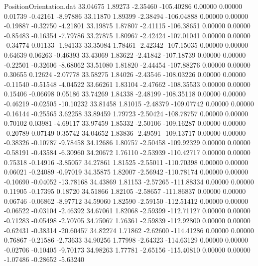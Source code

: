 \begin{filecontents}{PositionOrientation.dat}
  33.04675    1.89273   -2.35460  -105.40286    0.00000    0.00000    0.01739   -0.42161   -8.97886
  33.11870    1.89399   -2.38494  -106.04888    0.00000    0.00000   -0.19887   -0.32750   -4.21801
  33.19875    1.87807   -2.41115  -106.38651    0.00000    0.00000   -0.85483   -0.16354   -7.79786
  33.27875    1.80967   -2.42424  -107.01041    0.00000    0.00000   -0.34774    0.01133   -1.94133
  33.35084    1.78461   -2.42342  -107.15035    0.00000    0.00000    0.64639    0.06263   -0.46393
  33.43069    1.83622   -2.41842  -107.18739    0.00000    0.00000   -0.22501   -0.32606   -8.68062
  33.51080    1.81820   -2.44454  -107.88276    0.00000    0.00000    0.30655    0.12624   -2.07778
  33.58275    1.84026   -2.43546  -108.03226    0.00000    0.00000   -0.11540   -0.51548   -4.04522
  33.66261    1.83104   -2.47662  -108.35533    0.00000    0.00000    0.15406   -0.06698    0.05186
  33.74269    1.84338   -2.48199  -108.35118    0.00000    0.00000   -0.46219   -0.02505  -10.10232
  33.81458    1.81015   -2.48379  -109.07742    0.00000    0.00000   -0.16144   -0.25565    3.62258
  33.89459    1.79723   -2.50424  -108.78757    0.00000    0.00000    0.70102    0.03981   -4.69117
  33.97459    1.85332   -2.50106  -109.16287    0.00000    0.00000   -0.20789    0.07149    0.35742
  34.04652    1.83836   -2.49591  -109.13717    0.00000    0.00000   -0.38326   -0.10787   -9.78458
  34.12686    1.80757   -2.50458  -109.92329    0.00000    0.00000   -0.58191   -0.43584   -6.30960
  34.20672    1.76110   -2.53939  -110.42717    0.00000    0.00000    0.75318   -0.14916   -3.85057
  34.27861    1.81525   -2.55011  -110.70398    0.00000    0.00000    0.06021   -0.24089   -0.97019
  34.35875    1.82007   -2.56942  -110.78174    0.00000    0.00000   -0.10690   -0.04052  -13.78168
  34.43869    1.81153   -2.57265  -111.88334    0.00000    0.00000    0.11905   -0.17395    0.18720
  34.51866    1.82105   -2.58657  -111.86837    0.00000    0.00000    0.06746   -0.06862   -8.97712
  34.59060    1.82590   -2.59150  -112.51412    0.00000    0.00000   -0.06522   -0.03104   -2.46392
  34.67061    1.82068   -2.59399  -112.71127    0.00000    0.00000   -0.71283   -0.05498   -2.70705
  34.75067    1.76361   -2.59839  -112.92800    0.00000    0.00000   -0.62431   -0.38314  -20.60457
  34.82274    1.71862   -2.62600  -114.41286    0.00000    0.00000    0.76867   -0.21586   -2.73633
  34.90256    1.77998   -2.64323  -114.63129    0.00000    0.00000   -0.02706   -0.10405   -9.70173
  34.98263    1.77781   -2.65156  -115.40810    0.00000    0.00000   -1.07486   -0.28652   -5.63240

\end{filecontents}
